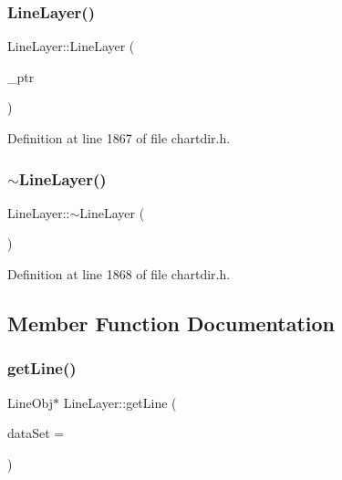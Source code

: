 \subsubsection{\texorpdfstring{Line\+Layer()}{LineLayer()}}
{\footnotesize\ttfamily Line\+Layer\+::\+Line\+Layer (\begin{DoxyParamCaption}\item[{Line\+Layer\+Internal $\ast$}]{\+\_\+ptr }\end{DoxyParamCaption})\hspace{0.3cm}{\ttfamily [inline]}}



Definition at line 1867 of file chartdir.\+h.

\mbox{\label{class_line_layer_a7501e67eff71d5c352e2bb3ab10e189f}} 
\subsubsection{\texorpdfstring{$\sim$\+Line\+Layer()}{~LineLayer()}}
{\footnotesize\ttfamily Line\+Layer\+::$\sim$\+Line\+Layer (\begin{DoxyParamCaption}{ }\end{DoxyParamCaption})\hspace{0.3cm}{\ttfamily [inline]}}



Definition at line 1868 of file chartdir.\+h.



\subsection{Member Function Documentation}
\mbox{\label{class_line_layer_a478b1ce70dc1ddc37f675ab8d2a158fc}} 
\subsubsection{\texorpdfstring{get\+Line()}{getLine()}}
{\footnotesize\ttfamily Line\+Obj$\ast$ Line\+Layer\+::get\+Line (\begin{DoxyParamCaption}\item[{int}]{data\+Set = {} }\end{DoxyParamCaption})\hspace{0.3cm}{\ttfamily [inline]}}



